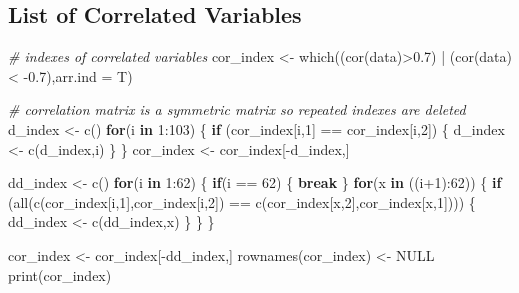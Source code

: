 \documentclass[12pt,twoside]{deuthesis}
\newenvironment{Shaded}{\begin{snugshade}}{\end{snugshade}}
\newcommand{\AttributeTok}[1]{\textcolor[rgb]{0.77,0.63,0.00}{#1}}
\newcommand{\CommentTok}[1]{\textcolor[rgb]{0.56,0.35,0.01}{\textit{#1}}}
\newcommand{\ConstantTok}[1]{\textcolor[rgb]{0.00,0.00,0.00}{#1}}
\newcommand{\ControlFlowTok}[1]{\textcolor[rgb]{0.13,0.29,0.53}{\textbf{#1}}}
\newcommand{\DecValTok}[1]{\textcolor[rgb]{0.00,0.00,0.81}{#1}}
\newcommand{\FloatTok}[1]{\textcolor[rgb]{0.00,0.00,0.81}{#1}}
\newcommand{\FunctionTok}[1]{\textcolor[rgb]{0.00,0.00,0.00}{#1}}
\newcommand{\NormalTok}[1]{#1}
\newcommand{\OtherTok}[1]{\textcolor[rgb]{0.56,0.35,0.01}{#1}}
\newcommand{\SpecialCharTok}[1]{\textcolor[rgb]{0.00,0.00,0.00}{#1}}
\begin{document}
\hypertarget{list-of-correlated-variables}{%
\subsection{List of Correlated Variables}\label{list-of-correlated-variables}}
\begin{Shaded}
\begin{Highlighting}[]
\CommentTok{\# indexes of correlated variables}
\NormalTok{cor\_index }\OtherTok{\textless{}{-}} \FunctionTok{which}\NormalTok{((}\FunctionTok{cor}\NormalTok{(data)}\SpecialCharTok{\textgreater{}}\FloatTok{0.7}\NormalTok{) }\SpecialCharTok{|}\NormalTok{ (}\FunctionTok{cor}\NormalTok{(data)}\SpecialCharTok{\textless{}} \SpecialCharTok{{-}}\FloatTok{0.7}\NormalTok{),}\AttributeTok{arr.ind =}\NormalTok{ T) }

\CommentTok{\# correlation matrix is a symmetric matrix so repeated indexes are deleted}
\NormalTok{d\_index }\OtherTok{\textless{}{-}} \FunctionTok{c}\NormalTok{()}
\ControlFlowTok{for}\NormalTok{(i }\ControlFlowTok{in} \DecValTok{1}\SpecialCharTok{:}\DecValTok{103}\NormalTok{) \{}
  \ControlFlowTok{if}\NormalTok{ (cor\_index[i,}\DecValTok{1}\NormalTok{] }\SpecialCharTok{==}\NormalTok{ cor\_index[i,}\DecValTok{2}\NormalTok{]) \{}
\NormalTok{    d\_index }\OtherTok{\textless{}{-}} \FunctionTok{c}\NormalTok{(d\_index,i)}
\NormalTok{  \}}
\NormalTok{\}}
\NormalTok{cor\_index }\OtherTok{\textless{}{-}}\NormalTok{ cor\_index[}\SpecialCharTok{{-}}\NormalTok{d\_index,]}

\NormalTok{dd\_index }\OtherTok{\textless{}{-}} \FunctionTok{c}\NormalTok{()}
\ControlFlowTok{for}\NormalTok{(i }\ControlFlowTok{in} \DecValTok{1}\SpecialCharTok{:}\DecValTok{62}\NormalTok{) \{}
  \ControlFlowTok{if}\NormalTok{(i }\SpecialCharTok{==} \DecValTok{62}\NormalTok{) \{}
    \ControlFlowTok{break}
\NormalTok{  \}}
  \ControlFlowTok{for}\NormalTok{(x }\ControlFlowTok{in}\NormalTok{ ((i}\SpecialCharTok{+}\DecValTok{1}\NormalTok{)}\SpecialCharTok{:}\DecValTok{62}\NormalTok{)) \{}
    \ControlFlowTok{if}\NormalTok{ (}\FunctionTok{all}\NormalTok{(}\FunctionTok{c}\NormalTok{(cor\_index[i,}\DecValTok{1}\NormalTok{],cor\_index[i,}\DecValTok{2}\NormalTok{]) }\SpecialCharTok{==} \FunctionTok{c}\NormalTok{(cor\_index[x,}\DecValTok{2}\NormalTok{],cor\_index[x,}\DecValTok{1}\NormalTok{]))) \{}
\NormalTok{      dd\_index }\OtherTok{\textless{}{-}} \FunctionTok{c}\NormalTok{(dd\_index,x)}
\NormalTok{    \}}
\NormalTok{  \}}
\NormalTok{\}}


\NormalTok{cor\_index }\OtherTok{\textless{}{-}}\NormalTok{ cor\_index[}\SpecialCharTok{{-}}\NormalTok{dd\_index,]}
\FunctionTok{rownames}\NormalTok{(cor\_index) }\OtherTok{\textless{}{-}} \ConstantTok{NULL}
\FunctionTok{print}\NormalTok{(cor\_index)}
\end{Highlighting}
\end{Shaded}
\end{document}
